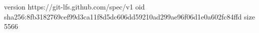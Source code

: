 version https://git-lfs.github.com/spec/v1
oid sha256:8fb3182769cef99d3ca11f8d5dc606dd59210ad299ae96f06d1e0a602fc84ffd
size 5566
